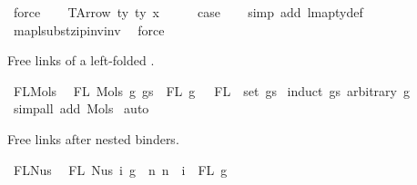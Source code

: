 \begin{isabellebody}
\ force\isanewline
{}\isamarkupfalse%
\isanewline
\ \ \isamarkupfalse%
\ {\isacharparenleft}{\kern0pt}TArrow\ ty{}\ ty{}\ x{}{\isacharparenright}{\kern0pt}\isanewline
\ \ \isamarkupfalse%
\ \isamarkupfalse%
\ {\isacharquery}{\kern0pt}case\isanewline
\ \ \isamarkupfalse%
\ {\isacharparenleft}{\kern0pt}simp\ add{\isacharcolon}{\kern0pt}\ lmap{\isacharunderscore}{\kern0pt}ty{\isacharunderscore}{\kern0pt}def{\isacharparenright}{\kern0pt}\isanewline
\ \ \isamarkupfalse%
\ map{\isacharunderscore}{\kern0pt}lsubst{\isacharunderscore}{\kern0pt}zip{\isacharunderscore}{\kern0pt}inv{\isacharunderscore}{\kern0pt}inv\ \isamarkupfalse%
\ force\isanewline
{}\isamarkupfalse%
%
\endisatagproof
{\isafoldproof}%
%
\isadelimproof
%
\endisadelimproof
%
\begin{isamarkuptext}%
Free links of a left-folded .%
\end{isamarkuptext}\isamarkuptrue%
\isamarkupfalse%
\ FL{\isacharunderscore}{\kern0pt}Mols{}{\isacharcolon}{\kern0pt}\isanewline
\ \ {\isachardoublequoteopen}FL\ {\isacharparenleft}{\kern0pt}Mols{}\ g\ gs{\isacharparenright}{\kern0pt}\ {\isacharequal}{\kern0pt}\ FL\ g\ {\isasymunion}\ {\isasymUnion}\ {\isacharparenleft}{\kern0pt}FL\ {\isacharbackquote}{\kern0pt}\ set\ gs{\isacharparenright}{\kern0pt}{\isachardoublequoteclose}\isanewline
%
\isadelimproof
%
\endisadelimproof
%
\isatagproof
{}\isamarkupfalse%
\ {\isacharparenleft}{\kern0pt}induct\ gs\ arbitrary{\isacharcolon}{\kern0pt}\ g{\isacharparenright}{\kern0pt}\isanewline
{}\isamarkupfalse%
\ {\isacharparenleft}{\kern0pt}simp{\isacharunderscore}{\kern0pt}all\ add{\isacharcolon}{\kern0pt}\ Mols{}{\isacharparenright}{\kern0pt}\isanewline
{}\isamarkupfalse%
\ auto%
\endisatagproof
{\isafoldproof}%
%
\isadelimproof
%
\endisadelimproof
%
\begin{isamarkuptext}%
Free links after  nested  binders.%
\end{isamarkuptext}\isamarkuptrue%
\isamarkupfalse%
\ FL{\isacharunderscore}{\kern0pt}Nus{}{\isacharcolon}{\kern0pt}\isanewline
\ \ {\isachardoublequoteopen}FL\ {\isacharparenleft}{\kern0pt}Nus{}\ i\ g{\isacharparenright}{\kern0pt}\ {\isacharequal}{\kern0pt}\ {\isacharbraceleft}{\kern0pt}n{\isachardot}{\kern0pt}\ n\ {\isacharplus}{\kern0pt}\ i\ {\isasymin}\ FL\ g{\isacharbraceright}{\kern0pt}{\isachardoublequoteclose}\isanewline

\end{isabellebody}
